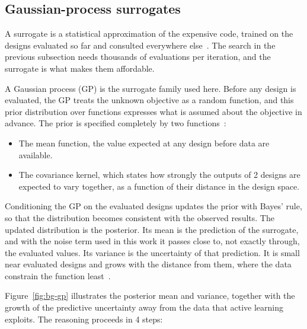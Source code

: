 \FloatBarrier


\subsection{Gaussian-process surrogates}
\label{sec:bg-gp}

A surrogate is a statistical approximation of the expensive code, trained
on the designs evaluated so far and consulted everywhere
else~\cite{forrester_book_2008}. The search in the previous subsection
needs thousands of evaluations per iteration, and the surrogate is what
makes them affordable.

A Gaussian process (GP) is the surrogate family used here. Before any
design is evaluated, the GP treats the unknown objective as a random
function, and this prior distribution over functions expresses what is
assumed about the objective in advance. The prior is specified
completely by two functions~\cite{rasmussen_gp_2006}:

\begin{itemize}
  \item The mean function, the value expected at any design before data
        are available.

  \item The covariance kernel, which states how strongly the outputs of
        2 designs are expected to vary together, as a function of
        their distance in the design space.
\end{itemize}

Conditioning the GP on the evaluated designs updates the prior with
Bayes' rule, so that the distribution becomes consistent with the
observed results. The updated distribution is the posterior. Its mean is
the prediction of the surrogate, and with the noise term used in this
work it passes close to, not exactly through, the evaluated values. Its
variance is the uncertainty of that prediction. It is small near
evaluated designs and grows with the distance from them, where the data
constrain the function least~\cite{rasmussen_gp_2006}.

Figure~\ref{fig:bg-gp} illustrates the posterior mean and variance,
together with the growth of the predictive uncertainty away from the
data that active learning exploits. The reasoning proceeds in 4 steps:


